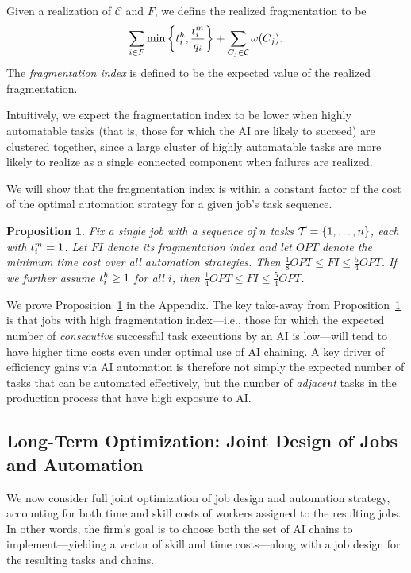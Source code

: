 \documentclass{article}
\theoremstyle{plain}
\theoremstyle{plain}
\newtheorem{proposition}{Proposition}
\begin{document}
Given a realization of $\mathcal{C}$ and $F$, we define the realized fragmentation to be 
\[ \sum_{i \in F}\min\left\{t^{h}_{i}, \frac{t^{m}_{i}}{q_i}\right\} + \sum_{C_j \in \mathcal{C}} \omega(C_j).\]
The \emph{fragmentation index} is defined to be the expected value of the realized fragmentation.

Intuitively, we expect the fragmentation index to be lower when highly automatable tasks (that is, those for which the AI are likely to succeed) are clustered together, since a large cluster of highly automatable tasks are more likely to realize as a single connected component when failures are realized.

We will show that the fragmentation index is within a constant factor of the cost of the optimal automation strategy for a given job's task sequence.

\begin{proposition}
\label{prop:fragmentation}
    Fix a single job with a sequence of $n$ tasks $\mathcal{T} = \{1, \dotsc, n\}$, each with $t^{m}_{i} = 1$.  Let $FI$ denote its fragmentation index and let $OPT$ denote the minimum time cost over all automation strategies.  Then $\tfrac{1}{8}OPT \leq FI \leq \tfrac{5}{4}OPT$.
    If we further assume $t^{h}_{i} \geq 1$ for all $i$, then $\tfrac{1}{4}OPT \leq FI \leq \tfrac{5}{4}OPT$.
\end{proposition}

We prove Proposition~\ref{prop:fragmentation} in the Appendix.   The key take-away from Proposition~\ref{prop:fragmentation} is that jobs with high fragmentation index---i.e., those for which the expected number of \emph{consecutive} successful task executions by an AI is low---will tend to have higher time costs even under optimal use of AI chaining.  A key driver of efficiency gains via AI automation is therefore not simply the expected number of tasks that can be automated effectively, but the number of \emph{adjacent} tasks in the production process that have high exposure to AI.

\subsection{Long-Term Optimization: Joint Design of Jobs and Automation}

We now consider full joint optimization of job design and automation strategy, accounting for both time and skill costs of workers assigned to the resulting jobs.  In other words, the firm's goal is to choose both the set of AI chains to implement---yielding a vector of skill and time costs---along with a job design for the resulting tasks and chains.
\end{document}
